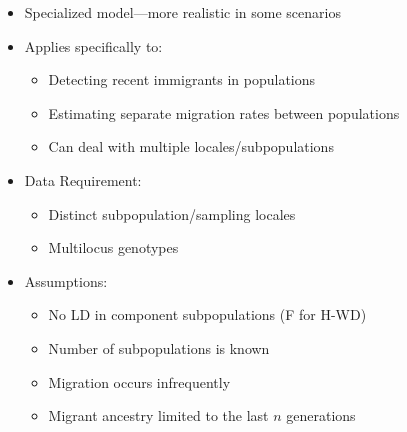 \begin{itemize}
\item Specialized model---more realistic in some scenarios
\item Applies specifically to:
\begin{itemize}
\item Detecting recent immigrants in populations
\item Estimating separate migration rates between populations
\item Can deal with multiple locales/subpopulations
\end{itemize}
\item Data Requirement:
\begin{itemize}
\item Distinct subpopulation/sampling locales 
\item Multilocus genotypes
\end{itemize}
\item Assumptions:
\begin{itemize}
\item No LD in component subpopulations (F for H-WD)
\item Number of subpopulations is known
\item Migration occurs infrequently
\item Migrant ancestry limited to the last $n$ generations
\end{itemize}
\end{itemize}








